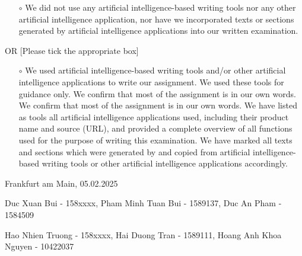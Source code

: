 \documentclass[open=right,  %
    paper=a4,               %
    fontsize=11pt,          %
    headings=small,         %
    headsepline=true,       %
    footsepline=false,      %
    bibliography=totoc,     %
    twoside=true,             %
    DIV=7,                  %
    chapterprefix=true,     %
    cleardoublepage=plain]{scrbook}
\newcommand{\frauasort}{Frankfurt am Main}    %
\newcommand{\frauasdatum}{05.02.2025} %
\begin{document}
\begin{itemize}
  \item[$\circ$] We did not use any artificial intelligence-based writing tools nor any other artificial intelligence application, nor have we incorporated texts or sections generated by artificial intelligence applications into our written examination.
\end{itemize}

\noindent OR \textup{[Please tick the appropriate box]}

\begin{itemize}
  \item[$\circ$]{
    We used artificial intelligence-based writing tools and/or other artificial intelligence applications to write our assignment.
    We used these tools for guidance only.
    We confirm that most of the assignment is in our own words.
    We confirm that most of the assignment is in our own words. We have listed as tools all artificial intelligence applications used, including their product name and source (URL), and provided a complete overview of all functions used for the purpose of writing this examination.
    We have marked all texts and sections which were generated by and copied from artificial intelligence-based writing tools or other artificial intelligence applications accordingly.
  }
\end{itemize}

\upshape

\vspace{1cm}
\noindent \frauasort, \frauasdatum

\vspace{2cm}
\noindent Duc Xuan Bui - 158xxxx, Pham Minh Tuan Bui - 1589137,  Duc An Pham - 1584509

\vspace{2cm}
\noindent Hao Nhien Truong - 158xxxx, Hai Duong Tran - 1589111, Hoang Anh Khoa Nguyen - 10422037

\cleardoublepage
{}
\tableofcontents
\cleardoublepage

\onehalfspacing




\label{lastpage}

\cleardoublepage 
\end{document}

